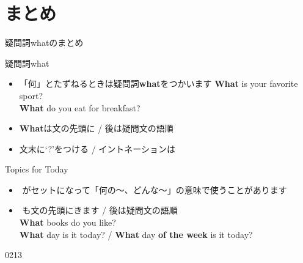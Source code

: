 \documentclass[aspectratio=169,xcolor={dvipsnames,table}]{beamer}
\begin{document}
\section{まとめ}
\begin{frame}[plain]{疑問詞whatのまとめ}

\begin{block}{疑問詞what }
\begin{itemize}[square]\small
 \item \<「何」とたずねるときは疑問詞\textbf{what}をつかいます%
\hfill{\scriptsize \textbf{What} is your favorite sport?}\\
\hfill{\scriptsize \textbf{What} do you eat for breakfast?}
 \item \textbf{What}は文の先頭に / 後は疑問文の語順
 \item   文末に`?'をつける / イントネーションは\myDownwardPitch{}
\end{itemize}
     \end{block}

\begin{block}{Topics for Today}
\begin{itemize}[square]\small
 \item {}\,\,がセットになって「何の〜、どんな～」の意味で使うことがあります
 \item {}\,\,も文の先頭にきます / 後は疑問文の語順\\
\hfill{\scriptsize \textbf{What} books do you like?}\\
\hfill{\scriptsize \textbf{What} day is it today? / \textbf{What} day \textbf{of the week} is it today?}
\end{itemize}
     \end{block}

\hfill{\tiny 0213}\,{\scriptsize {}}
\end{frame}
\end{document}
